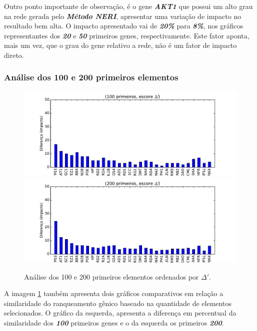 Outro ponto importante de observação, é o gene \textsl{\textbf{AKT1}} que possui um alto grau na rede gerada pelo \textsl{\textbf{Método NERI}}, apresentar uma variação de impacto no resultado bem alta. O impacto apresentado vai de \textsl{\textbf{20\%}} para \textsl{\textbf{8\%}}, nos gráficos representantes dos \textsl{\textbf{20}} e \textsl{\textbf{50}} primeiros genes, respectivamente. Este fator aponta, mais um vez, que o grau do gene relativo a rede, não é um fator de impacto direto.

%
\subsubsection{Análise dos 100 e 200 primeiros elementos}
%
\begin{figure}[ht!]
\includegraphics[width=1\textwidth]{Images/analyses/fig_LOO_S_100.pdf}
\includegraphics[width=1\textwidth]{Images/analyses/fig_LOO_S_200.pdf}
\caption {Análise dos 100 e 200 primeiros elementos ordenados por $\Delta'$.
\label{fig_LOO_S_100-200}}
\end{figure}
%
A imagem \ref{fig_LOO_S_100-200} também apresenta dois gráficos comparativos em relação a similaridade do ranqueamento gênico baseado na quantidade de elementos selecionados. O gráfico da esquerda, apresenta a diferença em percentual da similaridade dos \textbf{\textit{100}} primeiros genes e o da esquerda os primeiros \textbf{\textit{200}}.

